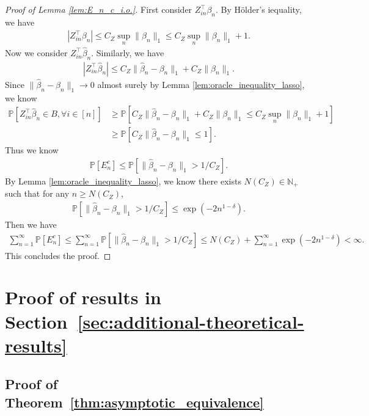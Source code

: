 \documentclass[12pt]{article}
\theoremstyle{definition}
\def\P{\mathbb{P}}
\def\P{\mathbb{P}}
\renewcommand{\P}{\mathbb{P}}							%
\newcommand{\srz}{Z}									%
\begin{document}
\begin{proof}[Proof of Lemma \ref{lem:E_n_c_i.o.}]
  First consider $\srz_{in}^\top\beta_n$. By H\"older's iequality, we have
  \begin{align*}
    |\srz_{in}^\top\beta_n|\leq C_Z\sup_n\|\beta_n\|_1\leq C_Z\sup_n\|\beta_n\|_1+1.
  \end{align*}
  Now we consider $Z_{in}^\top \widehat{\beta}_n$. Similarly, we have 
  \begin{align*}
    |\srz_{in}^\top\widehat{\beta}_n|\leq C_Z\|\widehat{\beta}_n-\beta_n\|_1+C_Z\|\beta_n\|_1.
  \end{align*}
  Since $\|\widehat{\beta}_n-\beta_n\|_1\rightarrow 0$ almost surely by Lemma \ref{lem:oracle_inequality_lasso}, we know 
  \begin{align*}
    \P[\srz_{in}^\top\widehat{\beta}_n\in B,\forall i\in [n]]
    &
    \geq \P[C_Z\|\widehat{\beta}_n-\beta_n\|_1+C_Z\|\beta_n\|_1\leq C_Z\sup_n\|\beta_n\|_1+1]\\
    &
    \geq \P[C_Z\|\widehat{\beta}_n-\beta_n\|_1\leq 1].
  \end{align*}
  Thus we know 
  \begin{align*}
    \P[E_n^c]\leq \P[\|\widehat{\beta}_n-\beta_n\|_1>1/C_Z].
  \end{align*}
  By Lemma \ref{lem:oracle_inequality_lasso}, we know there exists $N(C_Z)\in\mathbb{N}_{+}$ such that for any $n\geq N(C_Z)$,
  \begin{align*}
    \P[\|\widehat{\beta}_n-\beta_n\|_1>1/C_Z]\leq \exp(-2n^{1-\delta}).
  \end{align*}
  Then we have
  \begin{align*}
    \sum_{n=1}^{\infty}\P[E_n^c]\leq \sum_{n=1}^{\infty}\P[\|\widehat{\beta}_n-\beta_n\|_1>1/C_Z]\leq N(C_Z) + \sum_{n=1}^{\infty}\exp(-2n^{1-\delta})<\infty.
  \end{align*}
  This concludes the proof.
\end{proof}

\section{Proof of results in Section~\ref{sec:additional-theoretical-results}}


\subsection{Proof of Theorem~\ref{thm:asymptotic_equivalence}}
\end{document}
